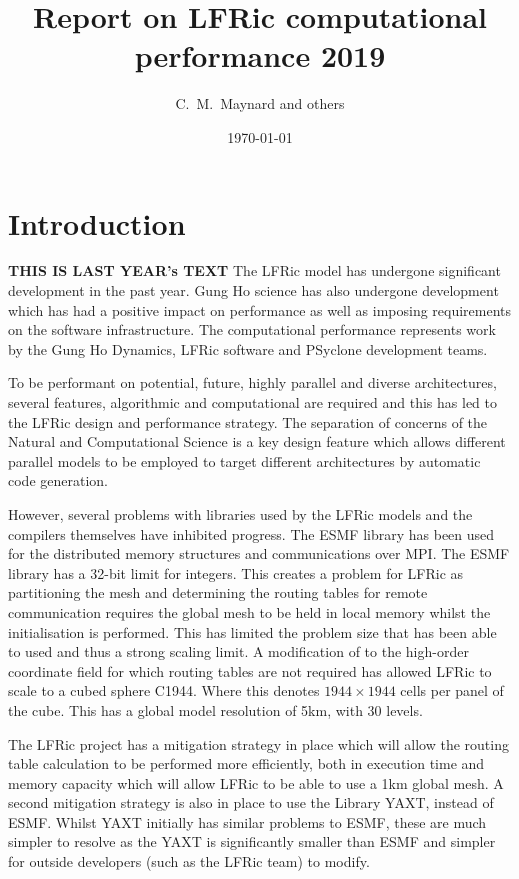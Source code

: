 \documentclass[11pt]{article}
\author{C.~M.~Maynard and others}
\title{Report on LFRic computational performance 2019}
\date{\today}
\begin{document}
\maketitle
\medskip
\section{Introduction\label{sec:intro}}
{\bf THIS IS LAST YEAR's TEXT}
The LFRic model has undergone significant development in the past
year. Gung Ho science has also undergone development which has had a
positive impact on performance as well as imposing requirements on the
software infrastructure. The computational performance represents work
by the Gung Ho Dynamics, LFRic software and PSyclone development teams.

To be performant on potential, future, highly
parallel and diverse architectures, several features, algorithmic and computational
are required and this has led to the LFRic design and performance
strategy. The separation of concerns of the Natural and Computational
Science is a key design feature which allows different parallel models
to be employed to target different architectures by automatic code generation.

However, several problems with libraries used by the LFRic models and
the compilers themselves have inhibited progress. The ESMF library has
been used for the distributed memory structures and communications
over MPI. The ESMF library has a 32-bit limit for integers. This
creates a problem for LFRic as partitioning the mesh and determining
the routing tables for remote communication requires the global mesh
to be held in local memory whilst the initialisation is
performed. This has limited the problem size that has been able to
used and thus a strong scaling limit. A modification of to the
high-order coordinate field for which routing tables are not required
has allowed LFRic to scale to a cubed sphere C1944. Where this denotes
$1944 \times 1944$ cells per panel of the cube. This has a global
model resolution of 5km, with 30 levels. 

The LFRic project has a mitigation strategy in place which will allow
the routing table calculation to be performed more efficiently, both
in execution time and memory capacity which will allow LFRic to be
able to use a 1km global mesh. A second mitigation strategy is also in
place to use the Library YAXT, instead of ESMF.  Whilst YAXT initially
has similar problems to ESMF, these are much simpler to resolve as the
YAXT is significantly smaller than ESMF and simpler for outside
developers (such as the LFRic team) to modify. 
\end{document}
